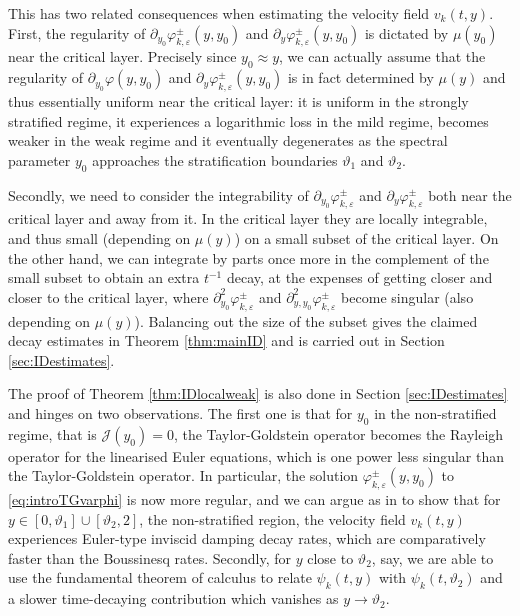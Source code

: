 \documentclass[11pt,reqno]{amsproc}
\theoremstyle{definition}
\numberwithin{equation}{section}
\newcommand{\cJ}{{\mathcal{J}}}
\newcommand{\ep}{\varepsilon}
\begin{document}
This has two related consequences when estimating the velocity field $v_k(t,y)$. First, the regularity of $\partial_{y_0}\varphi_{k,\ep}^\pm(y,y_0)$ and $\partial_y\varphi_{k,\ep}^\pm(y,y_0)$ is dictated by $\mu(y_0)$ near the critical layer. Precisely since $y_0\approx y$, we can actually assume that the regularity of $\partial_{y_0}\varphi(y,y_0)$ and $\partial_y\varphi_{k,\ep}^\pm(y,y_0)$ is in fact determined by $\mu(y)$ and thus essentially uniform near the critical layer: it is uniform in the strongly stratified regime, it experiences a logarithmic loss in the mild regime, becomes weaker in the weak regime and it eventually degenerates as the spectral parameter $y_0$ approaches the stratification boundaries $\vartheta_1$ and $\vartheta_2$.

Secondly, we need to consider the integrability of $\partial_{y_0}\varphi_{k,\ep}^\pm$ and $\partial_y\varphi_{k,\ep}^\pm$ both near the critical layer and away from it. In the critical layer they are locally integrable, and thus small (depending on $\mu(y)$) on a small subset of the critical layer. On the other hand, we can integrate by parts once more in the complement of the small subset to obtain an extra $t^{-1}$ decay, at the expenses of getting closer and closer to the critical layer, where $\partial_{y_0}^2\varphi_{k,\ep}^\pm$ and $\partial_{y,y_0}^2\varphi_{k,\ep}^\pm$ become singular (also depending on $\mu(y)$).  Balancing out the size of the subset gives the claimed decay estimates in Theorem \ref{thm:mainID} and is carried out in Section \ref{sec:IDestimates}.

The proof of Theorem \ref{thm:IDlocalweak} is also done in Section \ref{sec:IDestimates} and hinges on two observations. The first one is that for $y_0$ in the non-stratified regime, that is $\cJ(y_0)=0$, the Taylor-Goldstein operator becomes the Rayleigh operator for the linearised Euler equations, which is one power less singular than the Taylor-Goldstein operator. In particular, the solution $\varphi_{k,\ep}^\pm(y,y_0)$ to \eqref{eq:introTGvarphi} is now more regular, and we can argue as in \cite{Jia20, JiaGev20} to show that for $y\in[0,\vartheta_1]\cup [\vartheta_2,2]$, the non-stratified region, the velocity field $v_k(t,y)$ experiences Euler-type inviscid damping decay rates, which are comparatively faster than the Boussinesq rates.  Secondly, for $y$ close to $\vartheta_2$, say,  we are able to use the fundamental theorem of calculus to relate $\psi_k(t,y)$ with $\psi_k(t,\vartheta_2)$ and a slower time-decaying contribution which vanishes as $y\rightarrow \vartheta_2$. 
\end{document}

